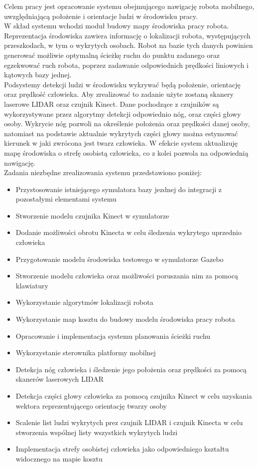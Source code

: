 Celem pracy jest opracowanie systemu obejmującego nawigację robota mobilnego, uwzględniającą położenie i orientacje ludzi w środowisku pracy.\\
\indent W skład systemu wchodzi moduł budowy mapy środowiska pracy robota. Reprezentacja środowiska zawiera informację o lokalizacji robota, występujących przeszkodach, w tym o wykrytych osobach. Robot na bazie tych danych powinien generować możliwie optymalną ścieżkę ruchu do punktu zadanego oraz egzekwować ruch robota, poprzez zadawanie odpowiednich prędkości liniowych i kątowych bazy jednej. \\
\indent Podsystemy detekcji ludzi w środowisku wykrywać będą położenie, orientację oraz prędkość człowieka. Aby zrealizować to zadanie użyte zostaną skanery laserowe LIDAR oraz czujnik Kinect. Dane pochodzące z czujników są wykorzystywane przez algorytmy detekcji odpowiednio nóg, oraz części głowy osoby. Wykrycie nóg pozwoli na określenie położenia oraz prędkości danej osoby, natomiast na podstawie aktualnie wykrytych części głowy można estymować kierunek w jaki zwrócona jest twarz człowieka. W efekcie system aktualizuję mapę środowiska o strefę osobistą człowieka, co z kolei pozwola na odpowiednią nawigację. \\

Zadania niezbędne zrealizowania systemu przedstawiono poniżej:

\begin{itemize}
\item Przystosowanie istniejącego symulatora bazy jezdnej do integracji z pozostałymi elementami systemu
\item Stworzenie modelu czujnika Kinect w symulatorze
\item Dodanie możliwości obrotu Kinecta w celu śledzenia wykrytego uprzednio człowieka
\item Przygotowanie modelu środowiska testowego w symulatorze Gazebo
\item Stworzenie modelu człowieka oraz możliwości poruszania nim za pomocą klawiatury
\item Wykorzystanie algorytmów lokalizacji robota
\item Wykorzystanie map kosztu do budowy modelu środowiska pracy robota
\item Opracowanie i implementacja systemu planowania ścieżki ruchu
\item Wykorzystanie sterownika platformy mobilnej
\item Detekcja nóg człowieka i śledzenie jego położenia oraz prędkości za pomocą skanerów laserowych LIDAR
\item Detekcja części głowy człowieka za pomocą czujnika Kinect w celu uzyskania wektora reprezentującego orientację twarzy osoby 
\item Scalenie list ludzi wykrytych prez czujnik LIDAR i czujnik Kinecta w celu stworzenia wspólnej listy wszystkich wykrytych ludzi
\item Implementacja strefy osobistej człowieka jako odpowiedniego kształtu widocznego na mapie kosztu 
\end{itemize}


